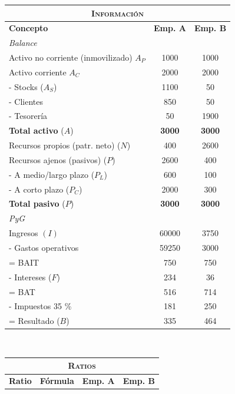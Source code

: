\documentclass[nochap,palatino,shortheader]{apuntes}
\begin{document}
\begin{table}[hbtp]
\begin{minipage}{\textwidth}
\centering
\footnotesize
\begin{tabular}{p{3.5cm}|c|c}
\multicolumn{3}{c}{\textsc{Información}} \\ \toprule
\textbf{Concepto} & \textbf{Emp. A} & \textbf{Emp. B} \\ \toprule
\multicolumn{3}{l}{\textit{Balance}} \\ \midrule
Activo no corriente (inmovilizado) $A_P$ & 1000 & 1000 \\
Activo corriente $A_C$ & 2000 & 2000 \\
\hspace{5pt} - Stocks ($A_S$) & 1100 & 50 \\
\hspace{5pt} - Clientes & 850 & 50 \\
\hspace{5pt} - Tesorería & 50 & 1900 \\
\textbf{Total activo} ($A$) & \textbf{3000} & \textbf{3000} \\ \midrule
Recursos propios (patr. neto) ($N$) & 400 & 2600 \\
Recursos ajenos (pasivos) ($P$) & 2600 & 400 \\
\hspace{5pt} - A medio/largo plazo ($P_L$) & 600 & 100 \\
\hspace{5pt} - A corto plazo ($P_C$) & 2000 & 300 \\
\textbf{Total pasivo} ($P$) & \textbf{3000} & \textbf{3000} \\ \midrule
\multicolumn{3}{l}{\textit{PyG}} \\ \midrule
Ingresos $(I)$ & 60000 & 3750 \\
- Gastos operativos & 59250 & 3000 \\
= BAIT & 750 & 750 \\
- Intereses ($F$) & 234 & 36 \\
= BAT & 516 & 714 \\
- Impuestos 35 \% & 181 & 250 \\
= Resultado ($B$) & 335 & 464
\end{tabular}
~
\begin{tabular}{p{2.5cm}|c|c|c}
\multicolumn{4}{c}{\textsc{Ratios}} \\ \toprule
\textbf{Ratio} & \textbf{Fórmula} & \textbf{Emp. A} & \textbf{Emp. B} \\ \toprule

\end{tabular}
\end{minipage}
\end{table}
\end{document}

